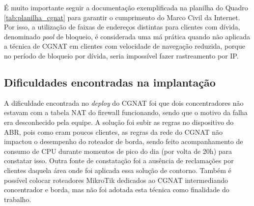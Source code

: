     É muito importante seguir a documentação exemplificada na planilha do Quadro \ref{tab:planilha_cgnat} para garantir o cumprimento do Marco Civil da Internet. Por isso, a utilização de faixas de endereços distintas para clientes com dívida, denominado \textit{pool} de bloqueio, é considerada uma má prática quando não aplicada a técnica de CGNAT em clientes com velocidade de navegação reduzida, porque no período de bloqueio por dívida, seria impossível fazer rastreamento por IP. 

\subsection{Dificuldades encontradas na implantação}
    
    A dificuldade encontrada no \textit{deploy} do CGNAT foi que dois concentradores não estavam com a tabela NAT do firewall funcionando, sendo que o motivo da falha era desconhecido pela equipe. A solução foi subir as regras no dispositivo do ABR, pois como eram poucos clientes, as regras da rede do CGNAT não impactou o desempenho do roteador de borda, sendo feito acompanhamento de consumo de CPU durante momentos de pico do dia (por volta de 20h) para constatar isso. Outra fonte de constatação foi a ausência de reclamações por clientes daquela área onde foi aplicada essa solução de contorno. Também é possível colocar roteadores MikroTik dedicados ao CGNAT intermediando concentrador e borda, mas não foi adotada esta técnica como finalidade do trabalho.
    